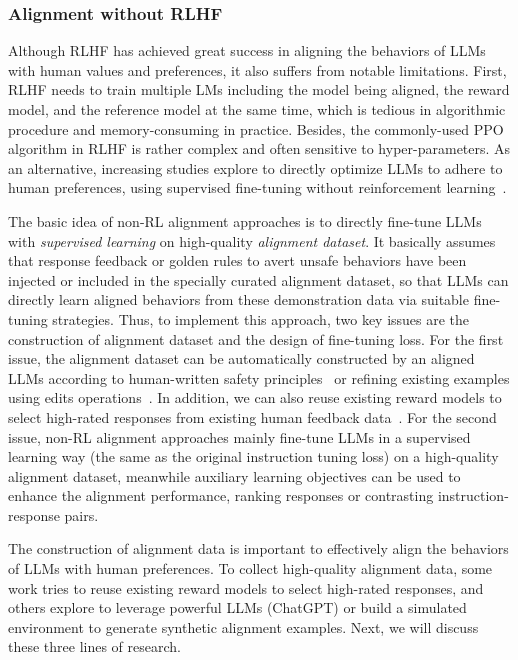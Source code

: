 \subsubsection{Alignment without RLHF}
\label{sec-alignment-withoutRL}

Although RLHF has achieved great success in aligning the behaviors of LLMs with human values and preferences, it also suffers from notable limitations. First, RLHF needs to train multiple LMs including the model being aligned, the reward model, and the reference model at the same time,  which is  tedious in algorithmic procedure and memory-consuming in practice. Besides, the commonly-used PPO algorithm in RLHF is rather complex and often sensitive to hyper-parameters. As an alternative, increasing studies explore to directly optimize LLMs to adhere to human preferences, using supervised fine-tuning without reinforcement learning~\cite{zhou-arxiv-2023-lima}.

The basic idea of non-RL alignment approaches is to directly fine-tune LLMs with \emph{supervised learning} on high-quality \emph{alignment dataset}.
It basically assumes that response feedback or golden rules to avert unsafe behaviors have been injected or included in the specially curated alignment dataset, so that LLMs can directly learn aligned behaviors from these demonstration data via suitable fine-tuning strategies. 
Thus, to implement this approach, two key issues are the construction of alignment dataset and the design of fine-tuning loss.  %
{For the first issue, the alignment dataset can be automatically constructed by an aligned LLMs according to human-written safety principles~\cite{Sun-arxiv-2023-Principle} or refining existing examples using edits operations~\cite{Liu-NeurIPS-2022-Second}. In addition, we can also reuse existing reward models to select high-rated responses from existing human feedback data~\cite{Dong-RAFT-2023-arxiv}. For the second issue,  non-RL alignment approaches mainly fine-tune  LLMs  in a  supervised learning way (the same as the original instruction tuning loss) on a high-quality alignment dataset, meanwhile auxiliary learning objectives can be used to enhance the  alignment performance, \eg  ranking responses or contrasting instruction-response pairs. } 




 {The construction of alignment data is important to effectively align the behaviors of LLMs with human preferences. To collect high-quality alignment data, 
some work tries to reuse existing reward models to {select} high-rated  responses,  and others explore to leverage powerful LLMs (\eg ChatGPT) or build a simulated environment to generate synthetic alignment examples. Next, we will discuss these three lines of research.
}

